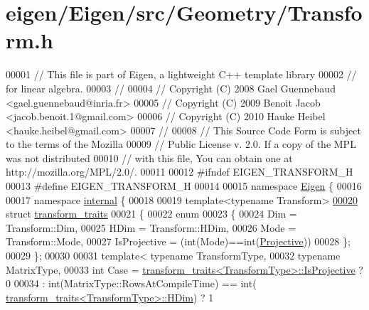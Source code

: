 \hypertarget{eigen_2_eigen_2src_2_geometry_2_transform_8h_source}{}\section{eigen/\+Eigen/src/\+Geometry/\+Transform.h}
\label{eigen_2_eigen_2src_2_geometry_2_transform_8h_source}

\begin{DoxyCode}
00001 \textcolor{comment}{// This file is part of Eigen, a lightweight C++ template library}
00002 \textcolor{comment}{// for linear algebra.}
00003 \textcolor{comment}{//}
00004 \textcolor{comment}{// Copyright (C) 2008 Gael Guennebaud <gael.guennebaud@inria.fr>}
00005 \textcolor{comment}{// Copyright (C) 2009 Benoit Jacob <jacob.benoit.1@gmail.com>}
00006 \textcolor{comment}{// Copyright (C) 2010 Hauke Heibel <hauke.heibel@gmail.com>}
00007 \textcolor{comment}{//}
00008 \textcolor{comment}{// This Source Code Form is subject to the terms of the Mozilla}
00009 \textcolor{comment}{// Public License v. 2.0. If a copy of the MPL was not distributed}
00010 \textcolor{comment}{// with this file, You can obtain one at http://mozilla.org/MPL/2.0/.}
00011 
00012 \textcolor{preprocessor}{#ifndef EIGEN\_TRANSFORM\_H}
00013 \textcolor{preprocessor}{#define EIGEN\_TRANSFORM\_H}
00014 
00015 \textcolor{keyword}{namespace }\hyperlink{namespace_eigen}{Eigen} \{ 
00016 
00017 \textcolor{keyword}{namespace }\hyperlink{namespaceinternal}{internal} \{
00018 
00019 \textcolor{keyword}{template}<\textcolor{keyword}{typename} Transform>
\hyperlink{struct_eigen_1_1internal_1_1transform__traits}{00020} \textcolor{keyword}{struct }\hyperlink{struct_eigen_1_1internal_1_1transform__traits}{transform\_traits}
00021 \{
00022   \textcolor{keyword}{enum}
00023   \{
00024     Dim = Transform::Dim,
00025     HDim = Transform::HDim,
00026     Mode = Transform::Mode,
00027     IsProjective = (int(Mode)==int(\hyperlink{group__enums_ggaee59a86102f150923b0cac6d4ff05107aead6a2de12a17aaa4f5c523215dfccad}{Projective}))
00028   \};
00029 \};
00030 
00031 \textcolor{keyword}{template}< \textcolor{keyword}{typename} TransformType,
00032           \textcolor{keyword}{typename} MatrixType,
00033           \textcolor{keywordtype}{int} Case = \hyperlink{struct_eigen_1_1internal_1_1transform__traits}{transform\_traits<TransformType>::IsProjective}
       ? 0
00034                    : int(MatrixType::RowsAtCompileTime) == int(
      \hyperlink{struct_eigen_1_1internal_1_1transform__traits}{transform\_traits<TransformType>::HDim}) ? 1

\end{DoxyCode}
